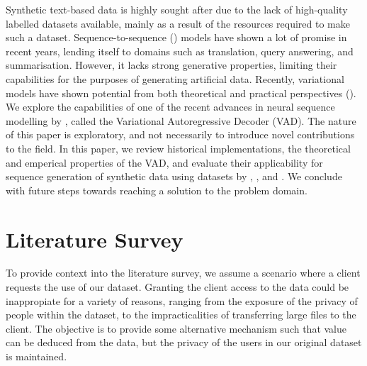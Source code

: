 \documentclass[12pt,twoside]{report}
\begin{document}
Synthetic text-based data is highly sought after due to the lack of high-quality labelled datasets available, mainly as a result of the resources required to make such a dataset.
Sequence-to-sequence (\cite{sutskever_sequence_2014}) models have shown a lot of promise in recent years, lending itself to domains such as translation, query answering, and summarisation. However, it lacks strong generative properties, limiting their capabilities for the purposes of generating artificial data.
Recently, variational models have shown potential from both theoretical and practical perspectives (\cite{kingma_auto-encoding_2013}). We explore the capabilities of one of the recent advances in neural sequence modelling by \cite{du_variational_2018}, called the Variational Autoregressive Decoder (VAD). The nature of this paper is exploratory, and not necessarily to introduce novel contributions to the field. In this paper, we review historical implementations, the theoretical and emperical properties of the VAD, and evaluate their applicability for sequence generation of synthetic data using datasets by \cite{he_ups_2016}, \cite{lison_opensubtitles2016:_2016}, and \cite{lison_opensubtitles2016:_2016}. We conclude with future steps towards reaching a solution to the problem domain.




\chapter{Literature Survey}
\label{lit_survey}

To provide context into the literature survey, we assume a scenario where a client requests the use of our dataset. Granting the client access to the data could be inappropiate for a variety of reasons, ranging from the exposure of the privacy of people within the dataset, to the impracticalities of transferring large files to the client. The objective is to provide some alternative mechanism such that value can be deduced from the data, but the privacy of the users in our original dataset is maintained.
\end{document}
